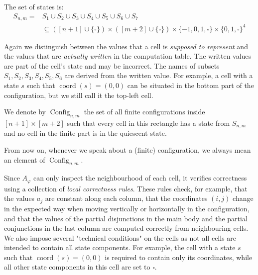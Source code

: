 \documentclass{article}
\theoremstyle{plain}
\theoremstyle{definition}
\DeclareMathOperator{\Config}{Config}
\DeclareMathOperator{\coord}{coord}
\begin{document}
The set of states is:
\begin{align}\label{eq:set_of_states_bound}
 S_{n,m} = & S_1 \cup S_2 \cup S_3 \cup S_4 \cup S_5 \cup S_6 \cup S_7  \\ & \subseteq \nonumber([n+1] \cup \{\square\}) \times([m+2]\cup \{\square\})\times\{-1, 0, 1, \square\} \times \{0,1, \square\}^4
\end{align}


Again we distinguish between the values that a cell is \emph{supposed to represent}
and the values that are \emph{actually written} in the computation table.
The written values are part of the cell's state and may be incorrect. The names of subsets $S_1, S_2, S_3, S_4, S_5, S_6$ are derived from the written value.
For example, a cell with a state $s$ such that $\coord(s) = (0,0)$ can be situated in the bottom part of the configuration, but we still call it the top-left cell.

We denote by $\Config_{n,m}$ the set of all finite configurations
inside $[n+1]\times [m+2]$ such that every cell in this rectangle
has a state from $S_{n,m}$ and no cell in the finite part is in the
quiescent state.


From now on, whenever we speak about a (finite) configuration, we always
mean an element of $\Config_{n,m}$.

Since $A_\varphi$ can only inspect the neighbourhood of each cell, it verifies
correctness using a collection of \emph{local correctness rules}.
These rules check, for example, that the values $a_j$ are constant along each
column, that the coordinates $(i,j)$ change in the expected way when moving
vertically or horizontally in the configuration, and that the values of the partial
disjunctions in the main body and the partial conjunctions in the last column are
computed correctly from neighbouring cells. We also impose several "technical conditions" on the cells as not all cells are intended to contain all state components. 
For example, the cell with a state $s$ such that $\coord(s) = (0,0)$ is required to contain only its coordinates, while all
other state components in this cell are set to $\square$.
\end{document}
